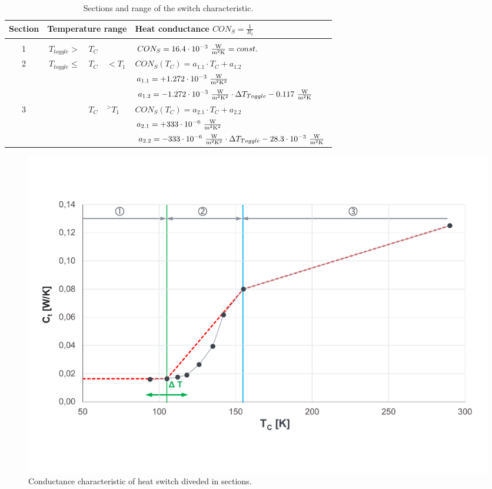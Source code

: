 \begin{table}[H]
	\centering
	\caption{Sections and range of the switch characteristic.}
	\begin{tabular}{c@{\qquad}rcl@{\qquad}l}
		\toprule
		Section & \multicolumn{3}{l}{Temperature range} & Heat conductance $CON_S= \frac{1}{R_t}$ \\ \midrule
		& & & &  \\[-0.5em]
		1 & $T_{toggle} >$ & $ T_C  $ & & $CON_{S}= 16.4 \cdot 10^{-3}\ \frac{{\rm W}}{{\rm m}^2 {\rm K}} = const.$\\[1.5em]
		2 & $T_{toggle}\leq$ & $ T_C $ & $ < T_1$ & $CON_{S} (T_C) = a_{1.1} \cdot T_C+ a_{1.2}$\\[1em]
		& & & & $a_{1.1}= +1.272\cdot 10^{-3}\ \frac{{\rm W}}{{\rm m}^2 {\rm K}^2}$ \\[1em]
		& & & & $  a_{1.2}= -1.272\cdot 10^{-3}\ \frac{\W}{\m^2 \K^2}\cdot \Delta T_{Toggle}-0.117\ \frac{\W}{\m^2 \K}$  \\[2em]
		3 & & 	$ T_C$ & $^ > T_1$ & $CON_{S}(T_C) = a_{2.1} \cdot T_C+ a_{2.2}$\\[1em]
		& & & & $a_{2.1}=+ 333\cdot 10^{-6}\ \frac{{\rm W}}{{\rm m}^2 {\rm K}^2}$ \\[1em]
		& & & & $  a_{2.2}= -333\cdot 10^{-6}\ \frac{{\rm W}}{{\rm m}^2 {\rm K}^2}\cdot \Delta T_{Toggle}-28.3 \cdot 10^{-3}\ \frac{{\rm W}}{{\rm m}^2 {\rm K}}$  \\[1em] \bottomrule
	\end{tabular}
	\label{tab:tcs_section}
\end{table}

\begin{figure}[htb]
	\centering
	\includegraphics[width=1\textwidth]{Media/tcs_diag_section}
	\caption{Conductance characteristic of heat switch diveded in sections.}
	\label{fig:tcs_switch03}
\end{figure}

